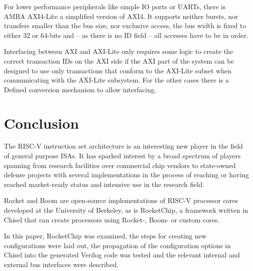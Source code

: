 \documentclass[journal,a4paper]{IEEEtran}
\begin{document}
For lower performance peripherals like simple IO ports or UARTs, there is AMBA AXI4-Lite\cite[B1]{axi} a simplified version of AXI4.
It supports neither bursts, nor transfers smaller than the bus size, nor exclusive access, the bus width is fixed to either 32 or 64-bits and -- as there is no ID field -- all accesses have to be in order.

Interfacing between AXI and AXI-Lite only requires some logic to create the correct transaction IDs on the AXI side if the AXI part of the system can be designed to use only transactions that conform to the AXI-Lite subset when communicating with the AXI-Lite subsystem.
For the other cases there is a Defined conversion mechanism\cite[B1.3]{axi} to allow interfacing.




\section{Conclusion}
The RISC-V instruction set architecture is an interesting new player in the field of general purpose ISAs.
It has sparked interest by a broad spectrum of players spanning from research facilities over commercial chip vendors to state-owned defense projects with several implementations in the process of reaching or having reached market-ready status and intensive use in the research field.

Rocket and Boom are open-source implementations of RISC-V processor cores developed at the University of Berkeley, as is RocketChip, a framework written in Chisel that can create processors using Rocket-, Boom- or custom cores.

In this paper, RocketChip was examined, the steps for creating new configurations were laid out, the propagation of the configuration options in Chisel into the generated Verilog code was tested and the relevant internal and external bus interfaces were described.
\end{document}
